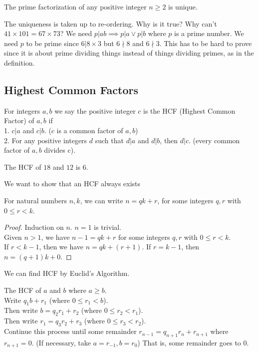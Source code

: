 \begin{theorem}
    The prime factorization of any positive integer $n\ge 2$ is unique.
\end{theorem}
The uniqueness is taken up to re-ordering.
Why is it true?
Why can't $41\times 101=67\times 73$?
We need $p|ab\implies p|a\lor p|b$ where $p$ is a prime number.
We need $p$ to be prime since $6|8\times3$ but $6\nmid 8$ and $6\nmid 3$.
This has to be hard to prove since it is about prime dividing things instead of things dividing primes, as in the definition.
\subsection{Highest Common Factors}
\begin{definition}
    For integers $a,b$ we say the positive integer $c$ is the HCF (Highest Common Factor) of $a,b$ if\\
    1. $c|a$ and $c|b$. ($c$ is a common factor of $a,b$)\\
    2. For any positive integers $d$ such that $d|a$ and $d|b$, then $d|c$. (every common factor of $a,b$ divides c).
\end{definition}
\begin{example}
    The HCF of $18$ and $12$ is $6$.
\end{example}
We want to show that an HCF always exists
\begin{proposition}
    For natural numbers $n,k$, we can write $n=qk+r$, for some integers $q,r$ with $0\le r<k$.
\end{proposition}
\begin{proof}
    Induction on $n$.
    $n=1$ is trivial.\\
    Given $n>1$, we have $n-1=qk+r$ for some integers $q,r$ with $0\le r<k$.\\
    If $r<k-1$, then we have $n=qk+(r+1)$.
    If $r=k-1$, then $n=(q+1)k+0$.
\end{proof}
We can find HCF by Euclid's Algorithm.
\begin{definition}
    The HCF of $a$ and $b$ where $a\ge b$.\\
    Write $q_1b+r_1$ (where $0\le r_1<b$).\\
    Then write $b=q_2r_1+r_2$ (where $0\le r_2<r_1$).\\
    Then write $r_1=q_3r_2+r_3$ (where $0\le r_3<r_2$).\\
    Continue this process until some remainder $r_{n-1}=q_{n+1}r_n+r_{n+1}$ where $r_{n+1}=0$.
    (If necessary, take $a=r_{-1}, b=r_0$)
    That is, some remainder goes to $0$. 
\end{definition}
